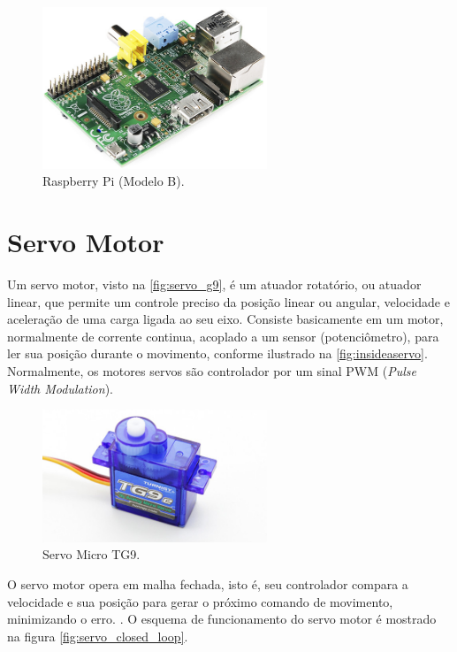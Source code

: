 \begin{figure}[H]
	\centering
	\includegraphics[width=0.6\textwidth]{figuras/raspberrypi_model_b.jpg}
	\caption{Raspberry Pi (Modelo B).}
	\label{fig:raspi_modelb}
\end{figure}

\section{Servo Motor}
\label{sec:servomotor}

Um servo motor, visto na \autoref{fig:servo_g9}, é um atuador rotatório, ou atuador linear, que permite um controle preciso da posição linear ou angular, velocidade e aceleração de uma carga ligada ao seu eixo. Consiste basicamente em um motor, normalmente de corrente continua, acoplado a um sensor (potenciômetro), para ler sua posição durante o movimento, conforme ilustrado na \autoref{fig:insideaservo}. Normalmente, os motores servos são controlador por um sinal PWM (\textit{Pulse Width Modulation}).  \par

\begin{figure}[h]
	\centering
	\includegraphics[width=0.6\textwidth]{figuras/servo_g9.jpg}
	\caption{Servo Micro TG9.}
	\label{fig:servo_g9}
\end{figure}

O servo motor opera em malha fechada, isto é, seu controlador compara a velocidade e sua posição para gerar o próximo comando de movimento, minimizando o erro. . O esquema de funcionamento do servo motor é mostrado na figura \autoref{fig:servo_closed_loop}. 

